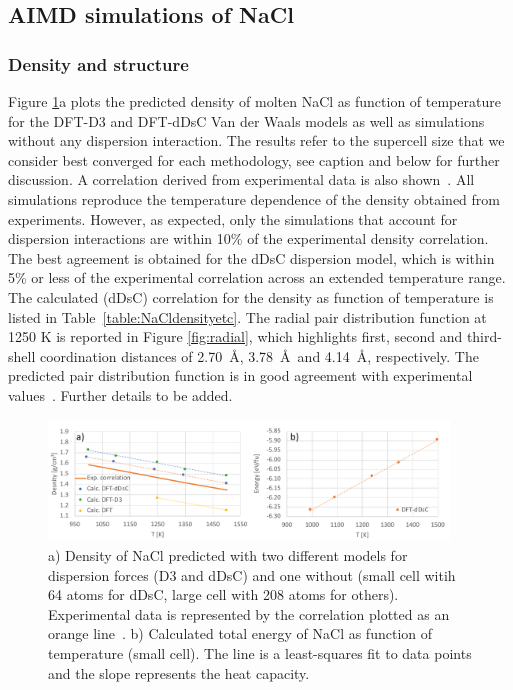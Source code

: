 \documentclass[preprint,3p,10pt,twocolumn,number,sort&compress]{elsarticle}
\begin{document}
\subsection{AIMD simulations of NaCl}
\subsubsection{Density and structure}
Figure \ref{fig:NaCldensity}a plots the predicted density of molten NaCl as function of temperature for the DFT-D3 and DFT-dDsC Van der Waals models as well as simulations without any dispersion interaction. The results refer to the supercell size that we consider best converged for each methodology, see caption and below for further discussion. A correlation derived from experimental data is also shown~\cite{Janz1988}. All simulations reproduce the temperature dependence of the density obtained from experiments. However, as expected, only the simulations that account for dispersion interactions are within 10\% of the experimental density correlation. The best agreement is obtained for the dDsC dispersion model, which is within 5\% or less of the experimental correlation across an extended temperature range. The calculated (dDsC) correlation for the density as function of temperature is listed in Table~\ref{table:NaCldensityetc}. 
The radial pair distribution function at 1250 K is reported in Figure \ref{fig:radial}, which highlights first, second and third-shell coordination distances of 2.70~\AA, 3.78~\AA~and 4.14~\AA, respectively. The predicted pair distribution function is in good agreement with experimental values~\cite{Edwards_1975}. {\color{red}Further details to be added.}

\begin{figure}[htb]
\centering
\includegraphics[width=0.95\textwidth]{FIG2.pdf}
\caption{a) Density of NaCl predicted with two different models for dispersion forces (D3 and dDsC) and one without (small cell witih 64 atoms for dDsC, large cell with 208 atoms for others). Experimental data is represented by the correlation plotted as an orange line~\cite{Janz1988}. b) Calculated total energy of NaCl as function of temperature (small cell). The line is a least-squares fit to data points and the slope represents the heat capacity.} %
\label{fig:NaCldensity}
\end{figure}
\end{document}
